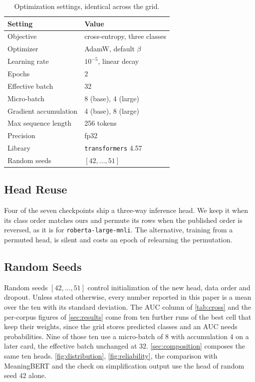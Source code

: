\documentclass[11pt]{article}
\begin{document}
\begin{table}[h]
\centering\small
\begin{tabular}{l l}
\toprule
Setting & Value \\
\midrule
Objective & cross-entropy, three classes \\
Optimizer & AdamW, default $\beta$ \\
Learning rate & $10^{-5}$, linear decay \\
Epochs & 2 \\
Effective batch & 32 \\
Micro-batch & 8 (base), 4 (large) \\
Gradient accumulation & 4 (base), 8 (large) \\
Max sequence length & 256 tokens \\
Precision & fp32 \\
Library & \texttt{transformers} 4.57 \\
Random seeds & $[42, \ldots, 51]$ \\
\bottomrule
\end{tabular}
\caption{Optimization settings, identical across the grid.}
\label{tab:optimisation}
\end{table}

\subsection{Head Reuse}

Four of the seven checkpoints ship a three-way inference head.
We keep it when its class order matches ours and permute its rows when the published order is reversed, as it is for \texttt{roberta-large-mnli}.
The alternative, training from a permuted head, is silent and costs an epoch of relearning the permutation.

\subsection{Random Seeds}

Random seeds $[42, \ldots, 51]$ control initialization of the new head, data order and dropout.
Unless stated otherwise, every number reported in this paper is a mean over the ten with its standard deviation.
The AUC column of \autoref{tab:cross} and the per-corpus figures of \autoref{sec:results} come from ten further runs of the best cell that keep their weights, since the grid stores predicted classes and an AUC needs probabilities.
Nine of those ten use a micro-batch of $8$ with accumulation $4$ on a later card, the effective batch unchanged at $32$.
\autoref{sec:composition} composes the same ten heads. \autoref{fig:distribution}, \autoref{fig:reliability}, the comparison with MeaningBERT and the check on simplification output use the head of random seed $42$ alone.
\end{document}
